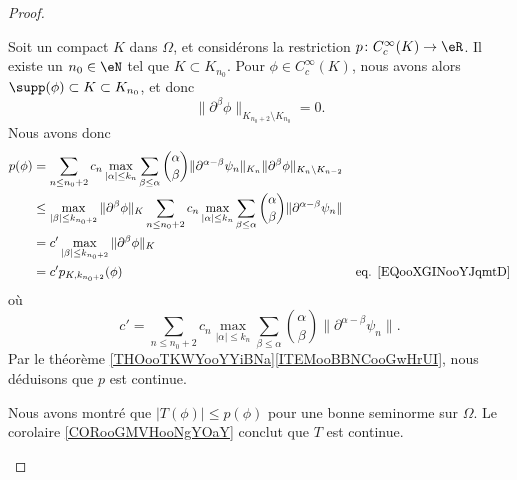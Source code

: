 \begin{proof}
\begin{subproof}
		Soit un compact \( K\) dans \( \Omega\), et considérons la restriction \(p \colon C_c^{\infty}(K)\to \eR  \). Il existe un \( n_0\in \eN\) tel que \( K\subset K_{n_0}\). Pour \( \phi\in C_c^{\infty}(K)\), nous avons alors \( \supp(\phi)\subset K\subset K_{n_0}\), et donc
		\begin{equation}
			\| \partial^{\beta}\phi \|_{K_{n_0+2}\setminus K_{n_0}}=0.
		\end{equation}
		Nous avons donc
		\begin{subequations}
			\begin{align}
				p(\phi) & = \sum_{n\leq n_0+2} c_n\max_{| \alpha |\leq k_n}\sum_{\beta\leq \alpha}\binom{ \alpha }{ \beta }\| \partial^{\alpha-\beta}\psi_n \|_{K_n}\| \partial^{\beta}\phi \|_{K_n\setminus K_{n-2}}                                            \\
				        & \leq \max_{| \beta |\leq k_{n_0+2}}  \| \partial^{\beta}\phi \|_K\sum_{n\leq n_0+2}c_n\max_{| \alpha |\leq k_n}\sum_{\beta\leq \alpha}\binom{ \alpha }{\beta}\| \partial^{\alpha-\beta}\psi_n \|                                       \\
				        & = c'\max_{| \beta |\leq k_{n_0+2}}\| \partial^{\beta}\phi \|_K                                                                                                                                                                         \\
				        & = c' p_{K,k_{n_0+2}}(\phi)                                                                                                                                                                       & \text{eq. \eqref{EQooXGINooYJqmtD}}
			\end{align}
		\end{subequations}
		où
		\begin{equation}
			c'= \sum_{n\leq n_0+2}c_n\max_{| \alpha |\leq k_n}\sum_{\beta\leq \alpha}\binom{ \alpha }{\beta}\| \partial^{\alpha-\beta}\psi_n \|.
		\end{equation}
		Par le théorème \ref{THOooTKWYooYYiBNa}\ref{ITEMooBBNCooGwHrUI}, nous déduisons que \( p\) est continue.

		\spitem[Conclusion]
		Nous avons montré que \( | T(\phi) |\leq p(\phi)\) pour une bonne seminorme sur \( \Omega\). Le corolaire \ref{CORooGMVHooNgYOaY} conclut que \( T\) est continue.

	\end{subproof}
\end{proof}

